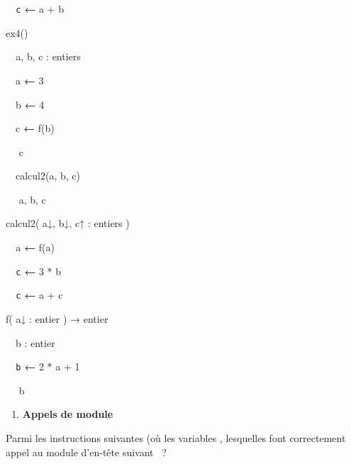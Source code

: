 {{\sffamily
\texttt{\ \ c} {\textbf{←}} a + b}

{\sffamily
{}}


\bigskip

{\sffamily
{} ex4()}

{\sffamily
{\texttt{\ \ }}{a, b, c
: entiers\ \ \ \ \ \ }}

{\sffamily
{\ \ }a {\textbf{←}} 3}

{\sffamily
\ \ b {\textbf{←}} 4\ \ }

{\sffamily
\ \ {c
}{\textbf{←}}{
f(b)\ \ \ \ \ \ }}

{\sffamily
\ \  c}

{\sffamily
\ \ calcul2(a, b, c)\ \ \ \ }

{\sffamily
\ \  a, b, c}

{\sffamily
{}}


\bigskip

{\sffamily
{} calcul2{(
a}{↓}{,
b}{↓}{,
c}{↑ :}{ entiers )}}

{\sffamily
\texttt{\ \ }a {\textbf{←}} f(a)}

{\sffamily
\texttt{\ \ c} {\textbf{←}} 3 * b}

{\sffamily
\texttt{\ \ c} {\textbf{←}} a + c}

{\sffamily
{}}


\bigskip

{\sffamily
{} f{(
a}{↓ :}{ entier )
}{→}{ entier}}

{\sffamily
\ \ b : entier}

{\sffamily
\texttt{\ \ b} {\textbf{←}} 2 * a + 1}

{\sffamily
\ \  b}

{\sffamily
{}}


\bigskip

\liststyleExercice
\setcounter{saveenum}{\value{enumi}}
\begin{enumerate}
\setcounter{enumi}{\value{saveenum}}
\item {\sffamily\bfseries
Appels de module}
\end{enumerate}
{
Parmi les instructions suivantes {(où les
variables
}, lesquelles font correctement appel au module
d’en-tête suivant
{\textsf{\ }}{?}}

}
